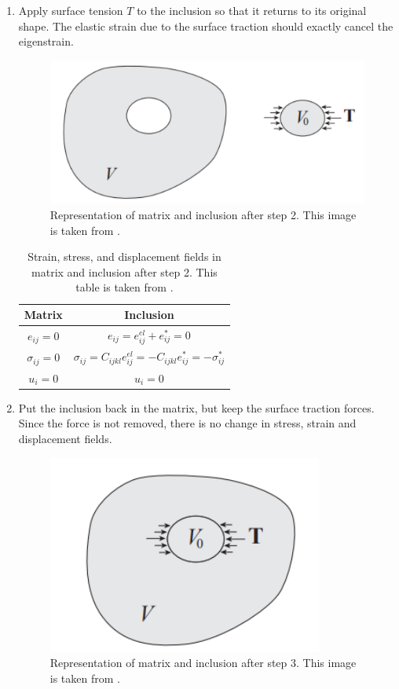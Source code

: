 \documentclass[12pt, a4paper]{report}
\begin{document}
\begin{enumerate}
    \item Apply surface tension $T$ to the inclusion so that it returns to its original shape. The elastic strain due to the surface traction should exactly cancel the eigenstrain.
        \begin{figure}[H]
            \centering
            \includegraphics [height=2 in]{eigstress3}
            \caption{Representation of matrix and inclusion after step 2. This image is taken from \cite{stanford_notes}.}
            \label{fig:eigstress3}
        \end{figure}
        \begin{table}[H]
            \centering
            \begin{tabular}{|c|c|}
                \hline
                \textbf{Matrix} & \textbf{Inclusion} \\
                \hline
                $e_{ij} = 0$ & $e_{ij} = e^{el}_{ij} + e^{*}_{ij} = 0$ \\
                $\sigma_{ij} = 0$ & $\sigma_{ij} = C_{ijkl}e^{el}_{ij} = -C_{ijkl}e^{*}_{ij} = -\sigma^{*}_{ij}$ \\
                $u_{i} = 0$ & $u_{i} = 0$ \\
                \hline
            \end{tabular}
            \caption{Strain, stress, and displacement fields in matrix and inclusion after step 2. This table is taken from \cite{stanford_notes}.}
            \label{tab:step2}
        \end{table}

    \item Put the inclusion back in the matrix, but keep the surface traction forces. Since the force is not removed, there is no change in stress, strain and displacement fields.
        \begin{figure}[H]
            \centering
            \includegraphics [height=2 in]{eigstress4}
            \caption{Representation of matrix and inclusion after step 3. This image is taken from \cite{stanford_notes}.}
            \label{fig:eigstress4}
        \end{figure}


\end{enumerate}
\end{document}
